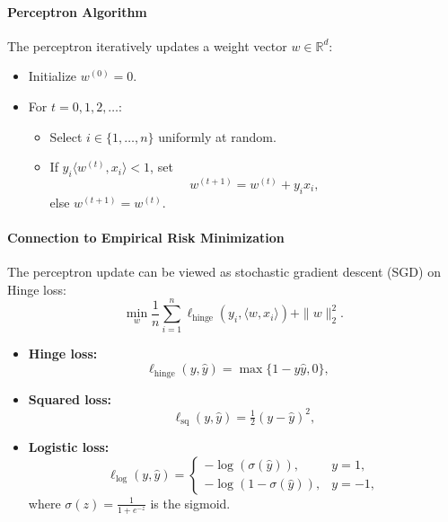 \documentclass[a4paper]{article}
\begin{document}
\paragraph{Perceptron Algorithm}
The perceptron iteratively updates a weight vector $w \in \mathbb{R}^d$:
\begin{itemize}
    \item Initialize $w^{(0)} = 0$.
    \item For $t = 0, 1, 2, \ldots$:
    \begin{itemize}
        \item Select $i \in \{1, \ldots, n\}$ uniformly at random.
        \item If $y_i \langle w^{(t)}, x_i \rangle < 1$, set
        \[
        w^{(t+1)} = w^{(t)} + y_i x_i,
        \]
        else $w^{(t+1)} = w^{(t)}$.
    \end{itemize}
\end{itemize}

\paragraph{Connection to Empirical Risk Minimization}
The perceptron update can be viewed as stochastic gradient descent (SGD) on Hinge loss:  
    $$\min_w \frac{1}{n} \sum_{i=1}^n \ell_{\mathrm{hinge}}(y_i, \langle w, x_i \rangle) + \|w\|_2^2.$$
\begin{itemize}
    \item \textbf{Hinge loss:} 
    \[
    \ell_{\mathrm{hinge}}(y, \hat{y}) = \max\{1 - y\hat{y}, 0\}, \quad 
    \]
    \item \textbf{Squared loss:} 
    \[
    \ell_{\mathrm{sq}}(y, \hat{y}) = \tfrac{1}{2}(y - \hat{y})^2, 
    \]
    \item \textbf{Logistic loss:} 
    \[
    \ell_{\mathrm{log}}(y, \hat{y}) = 
    \begin{cases}
        -\log(\sigma(\hat{y})), & y=1, \\
        -\log(1-\sigma(\hat{y})), & y=-1,
    \end{cases}
    \]
    where $\sigma(z) = \tfrac{1}{1+e^{-z}}$ is the sigmoid.
\end{itemize}
\end{document}
